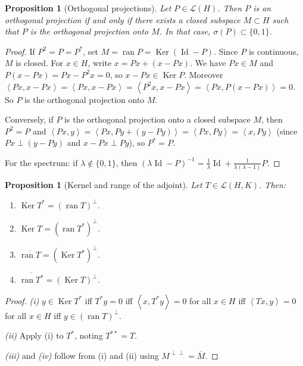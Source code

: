 \documentclass[a4paper,12pt]{book}
\DeclareMathOperator{\Id}{Id}
\DeclareMathOperator{\Ker}{Ker}
\DeclareMathOperator{\ran}{ran}
\newcommand{\inner}[2]{\left\langle #1, #2 \right\rangle}
\theoremstyle{definition}
\theoremstyle{plain}
\newtheorem{proposition}[definition]{Proposition}
\theoremstyle{remark}
\begin{document}
\begin{proposition}[Orthogonal projections]\label{prop:orth-proj-char}
Let $P\in\mathcal{L}(H)$. Then $P$ is an orthogonal projection if and only if
there exists a closed subspace $M\subset H$ such that $P$ is the orthogonal
projection onto $M$. In that case, $\sigma(P)\subset\{0,1\}$.
\end{proposition}

\begin{proof}
If $P^2=P=P^*$, set $M=\ran P = \Ker(\Id-P)$. Since $P$ is continuous, $M$ is
closed. For $x\in H$, write $x = Px + (x-Px)$. We have $Px\in M$ and
$P(x-Px)=Px-P^2 x=0$, so $x-Px\in\Ker P$. Moreover
$\inner{Px}{x-Px}=\inner{Px}{x-Px}=\inner{P^2 x}{x-Px}=\inner{Px}{P(x-Px)}=0$.
So $P$ is the orthogonal projection onto $M$.

Conversely, if $P$ is the orthogonal projection onto a closed subspace $M$, then
$P^2=P$ and $\inner{Px}{y}=\inner{Px}{Py+(y-Py)}=\inner{Px}{Py}=\inner{x}{Py}$
(since $Px\perp(y-Py)$ and $x-Px\perp Py$), so $P^*=P$.

For the spectrum: if $\lambda\notin\{0,1\}$, then
$(\lambda\Id-P)^{-1}=\frac{1}{\lambda}\Id + \frac{1}{\lambda(\lambda-1)}P$.
\end{proof}

\begin{proposition}[Kernel and range of the adjoint]\label{prop:ker-ran-adjoint}
Let $T\in\mathcal{L}(H,K)$. Then:
\begin{enumerate}[label=(\roman*)]
  \item $\Ker T^* = (\ran T)^\perp$.
  \item $\Ker T = (\ran T^*)^\perp$.
  \item $\overline{\ran T} = (\Ker T^*)^\perp$.
  \item $\overline{\ran T^*} = (\Ker T)^\perp$.
\end{enumerate}
\end{proposition}

\begin{proof}
\emph{(i)} $y\in\Ker T^*$ iff $T^*y=0$ iff $\inner{x}{T^*y}=0$ for all
$x\in H$ iff $\inner{Tx}{y}=0$ for all $x\in H$ iff $y\in(\ran T)^\perp$.

\emph{(ii)} Apply (i) to $T^*$, noting $T^{**}=T$.

\emph{(iii)} and \emph{(iv)} follow from (i) and (ii) using $M^{\perp\perp}=\overline{M}$.
\end{proof}
\end{document}
